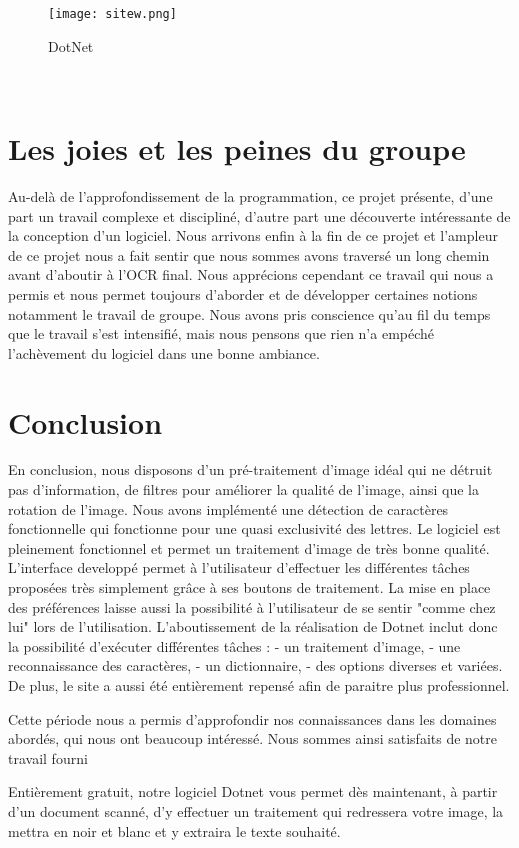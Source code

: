 \documentclass{article}
\begin{document}
    \begin{figure}[hp]
	    \centering
	    \texttt{[image: sitew.png]}
	    \caption{DotNet}
    \end{figure}
\\

       \section{Les joies et les peines du groupe}
Au-delà de l’approfondissement de la programmation, ce projet présente, d’une
part un travail complexe et discipliné, d’autre part une découverte intéressante de la
conception d’un logiciel. Nous arrivons enfin à la fin de ce projet et l’ampleur de ce
projet nous a fait sentir que nous sommes avons traversé un long chemin avant d’aboutir à
l’OCR final. Nous apprécions cependant ce travail qui nous a permis et nous permet toujours d’aborder et de développer certaines notions notamment le travail de groupe. Nous avons pris conscience qu’au fil du temps que le travail s'est intensifié, mais nous pensons que rien n’a empéché l’achèvement du logiciel dans une bonne ambiance.


       \section{Conclusion}

En conclusion, nous disposons d'un pré-traitement d'image idéal qui ne détruit pas d'information, de filtres pour améliorer la qualité de l'image, ainsi que la rotation de l'image. Nous avons implémenté une détection de caractères fonctionnelle qui fonctionne pour une quasi exclusivité des lettres.
Le logiciel est pleinement fonctionnel et permet un traitement d’image de très bonne qualité.
L’interface developpé permet à l’utilisateur d’effectuer les différentes tâches proposées très simplement grâce à ses boutons de traitement. La mise en place des préférences laisse aussi la possibilité à l’utilisateur de se sentir "comme chez lui" lors de l’utilisation.
L'aboutissement de la réalisation de Dotnet inclut donc la possibilité d'exécuter différentes tâches :
- un traitement d'image,
- une reconnaissance des caractères,
- un dictionnaire,
- des options diverses et variées.
De plus, le site a aussi été entièrement repensé afin de paraitre plus professionnel.

Cette période nous a permis d'approfondir nos connaissances dans les domaines abordés, qui nous ont beaucoup intéressé. Nous sommes ainsi satisfaits de notre travail fourni

Entièrement gratuit, notre logiciel Dotnet vous permet dès maintenant, à partir d'un document scanné, d'y effectuer un traitement qui redressera votre image, la mettra en noir et blanc et y extraira le texte souhaité.




\newpage
\end{document}
